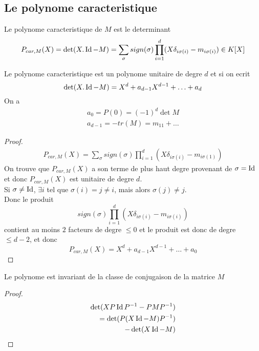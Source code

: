 \documentclass[../main.tex]{subfiles}
\begin{document}
\subsection{Le polynome caracteristique}
\begin{defn}
Le polynome caracteristique de $M$ est le determinant
\[ 
	P_{car,M} ( X) = \det ( X.\operatorname*{Id} - M)  = \sum_{\sigma} sign( \sigma) \prod_{i=1}^{d} ( X \delta_{i\sigma( i) } - m_{i\sigma( i) } ) \in K[X]
\]

\end{defn}
\begin{propo}
Le polynome caracteristique est un polynome unitaire de degre $d$ et si on ecrit
\[ 
	\det( X.\operatorname*{Id} - M) = X^{d} + a_{d-1} X^{d-1} + \ldots + a_d
\]
On a 
\begin{align*}
	a_0 = P( 0)  = ( -1)^{d}\det M\\
	a_{d-1} = -tr( M)  = m_{11} + \ldots 
\end{align*}

\end{propo}
\begin{proof}
\begin{align*}
	P_{car,M}( X) = \sum_\sigma sign( \sigma) \prod_{i=1}^{d}( X\delta_{i\sigma( i) } - m_{i\sigma( 1) } ) 
\end{align*}
On trouve que $P_{car,M} ( X) $ a son terme de plus haut degre provenant de $\sigma=\operatorname*{Id}$ et donc $P_{car,M} ( X) $ est unitaire de degre $d$.\\
Si $\sigma\neq \operatorname*{Id}$, $\exists i$ tel que $\sigma( i) =j \neq i$, mais alors $\sigma( j) \neq j$.\\
Donc le produit 
\[ 
	sign( \sigma) \prod_{i=1}^{d}( X\delta_{i\sigma( i) } -m_{i\sigma( i) } ) 
\]
contient au  moins $2$ facteurs de degre $\leq 0$ et le produit est donc de degre $\leq d-2$, et donc 
\[ 
	P_{car,M} ( X)  = X^{d} + a_{d-1} X^{d-1} + \ldots + a_0
\]

\end{proof}
\begin{propo}
Le polynome est invariant de la classe de conjugaison de la matrice $M$
\end{propo}
\begin{proof}
	\begin{align*}
		\det( XP\operatorname*{Id} P^{-1} - PMP^{-1}) \\
		=\det( P( X\operatorname*{Id} - M) P^{-1}) \\
		- \det( X\operatorname*{Id} - M) 
	\end{align*}
	
\end{proof}
\end{document}
